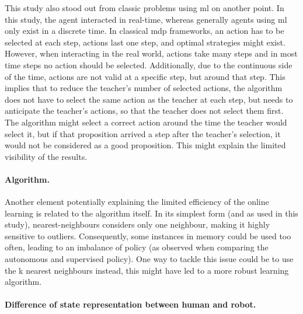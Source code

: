 This study also stood out from classic problems using \gls{ml} on another point. In this study, the agent interacted in real-time, whereas generally agents using \gls{ml} only exist in a discrete time. In classical \gls{mdp} frameworks, an action has to be selected at each step, actions last one step, and optimal strategies might exist. However, when interacting in the real world, actions take many steps and in most time steps no action should be selected. Additionally, due to the continuous side of the time, actions are not valid at a specific step, but around that step. This implies that to reduce the teacher's number of selected actions, the algorithm does not have to select the same action as the teacher at each step, but needs to anticipate the teacher's actions, so that the teacher does not select them first. The algorithm might select a correct action around the time the teacher would select it, but if that proposition arrived a step after the teacher's selection, it would not be considered as a good proposition. This might explain the limited visibility of the results. 

\paragraph{Algorithm.}

Another element potentially explaining the limited efficiency of the online learning is related to the algorithm itself. In its simplest form (and as used in this study), nearest-neighbours considers only one neighbour, making it highly sensitive to outliers. Consequently, some instances in memory could be used too often, leading to an imbalance of policy (as observed when comparing the autonomous and supervised policy). One way to tackle this issue could be to use the k nearest neighbours instead, this might have led to a more robust learning algorithm. 

\paragraph{Difference of state representation between human and robot.}

